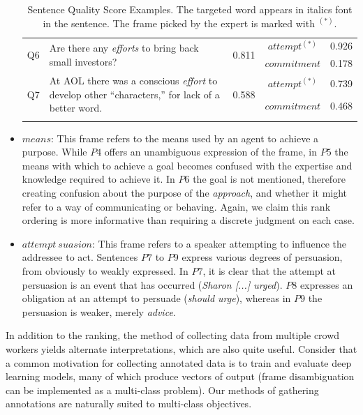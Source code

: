 \begin{itemize}
\begin{table}[tbh!]
{\begin{tabular}{cp{6cm}ccc}
\multirow{2}{*}{Q6} & \multirow{2}{6cm}{Are there any \textit{efforts} to bring back small investors?} & \multirow{2}{*}{0.811} & $attempt^{(*)}$ & 0.926 \\ %
& & & $commitment$ & 0.178 \\ \hline

\multirow{2}{*}{Q7} & \multirow{2}{6cm}{At AOL there was a conscious \textit{effort} to develop other ``characters,'' for lack of a better word.} & \multirow{2}{*}{0.588} &  $attempt^{(*)}$ & 0.739 \\ %
& & & $commitment$ & 0.468 \\
& & & & \\ %
\bottomrule


\end{tabular}
}
\caption{Sentence Quality Score Examples. The targeted word appears in italics font in the sentence. The frame picked by the expert is marked with $^{(*)}$.}
\label{tab:sqs}
\end{table}

\item $means$: This frame refers to the means used by an agent to achieve a purpose. While $P4$ offers an unambiguous expression of the frame, in $P5$ the means with which to achieve a goal becomes confused with the expertise and knowledge required to achieve it. In $P6$ the goal is not mentioned, therefore creating confusion about the purpose of the \textit{approach}, and whether it might refer to a way of communicating or behaving.  Again, we claim this rank ordering is more informative than requiring a discrete judgment on each case.

\item $attempt\ suasion$: This frame refers to a speaker attempting to influence the addressee to act. Sentences $P7$ to $P9$ express various degrees of persuasion, from obviously to weakly expressed. In $P7$, it is clear that the attempt at persuasion is an event that has occurred (\textit{Sharon [...] urged}). $P8$ expresses an obligation at an attempt to persuade (\textit{should urge}), whereas in $P9$ the persuasion is weaker, merely \textit{advice}.


\end{itemize}

In addition to the ranking, the method of collecting data from multiple crowd workers yields alternate interpretations, which are also quite useful.  Consider that a common motivation for collecting annotated data is to train and evaluate deep learning models, many of which produce vectors of output (frame disambiguation can be implemented as a multi-class problem).  Our methods of gathering annotations are naturally suited to multi-class objectives.

